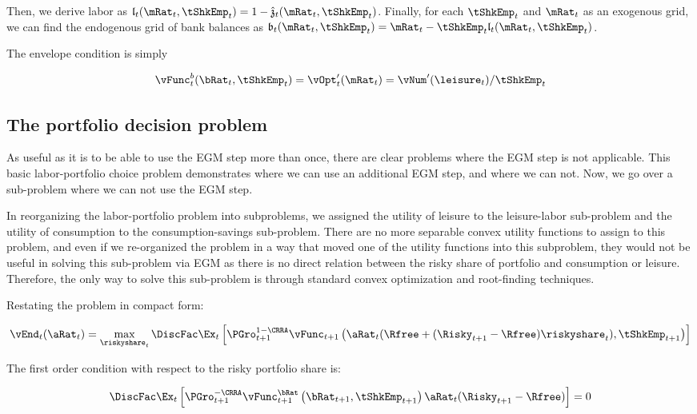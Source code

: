 \documentclass[\econtexRoot/EGMN]{subfiles}
\begin{document}
Then, we derive labor as $\lEndFunc_{t}(\mRat_{t}, \tShkEmp_{t}) = 1 -
    \hat{\zEndFunc}_{t}(\mRat_{t}, \tShkEmp_{t})$. Finally, for each
$\tShkEmp_{t}$ and
$\mRat_{t}$ as an exogenous grid, we can find the endogenous grid of bank
balances as $\bEndFunc_{t}(\mRat_{t}, \tShkEmp_{t}) = \mRat_{t} -
    \tShkEmp_{t}\lEndFunc_{t}(\mRat_{t}, \tShkEmp_{t})$.

The envelope condition is simply

\begin{equation}
    \vFunc_{t}^{b}(\bRat_{t}, \tShkEmp_{t}) = \vOpt_{t}'(\mRat_{t}) =
    \vNum'(\leisure_{t})/\tShkEmp_{t}
\end{equation}

\subsection{The portfolio decision problem}

As useful as it is to be able to use the EGM step more than once, there are clear problems where the EGM step is not applicable. This basic labor-portfolio choice problem demonstrates where we can use an additional EGM step, and where we can not. Now, we go over a sub-problem where we can not use the EGM step.

In reorganizing the labor-portfolio problem into subproblems, we assigned the utility of leisure to the leisure-labor sub-problem and the utility of consumption to the consumption-savings sub-problem. There are no more separable convex utility functions to assign to this problem, and even if we re-organized the problem in a way that moved one of the utility functions into this subproblem, they would not be useful in solving this sub-problem via EGM as there is no direct relation between the risky share of portfolio and consumption or leisure. Therefore, the only way to solve this sub-problem is through standard convex optimization and root-finding techniques.

Restating the problem in compact form:

\begin{equation}
    \vEnd_{t}(\aRat_{t}) = \max_{\riskyshare_{t}} \DiscFac \Ex_{t} \left[ \PGro_{t+1}^{1-\CRRA}
    \vFunc_{t+1}\left(\aRat_{t}(\Rfree + (\Risky_{t+1} - \Rfree) \riskyshare_{t}), \tShkEmp_{t+1}\right)
    \right]
\end{equation}

The first order condition with respect to the risky portfolio share is:

\begin{equation}
    \DiscFac \Ex_{t} \left[ \PGro_{t+1}^{-\CRRA} \vFunc_{t+1}^{\bRat}\left(\bRat_{t+1}, \tShkEmp_{t+1}\right) \aRat_{t}(\Risky_{t+1} - \Rfree)  \right] = 0
\end{equation}
\end{document}
